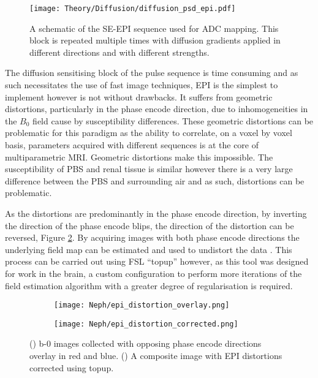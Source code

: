 \begin{figure}[H]
	\centering
	\texttt{[image: Theory/Diffusion/diffusion\_psd\_epi.pdf]}
	\caption{A schematic of the \ac{SE}-\ac{EPI} sequence used for \ac{ADC} mapping. This block is repeated multiple times with diffusion gradients applied in different directions and with different strengths.}
	\label{fig:ex_adc_psd}	
\end{figure}

The diffusion sensitising block of the pulse sequence is time consuming and as such necessitates the use of fast image techniques, \ac{EPI} is the simplest to implement however is not without drawbacks. It suffers from geometric distortions, particularly in the phase encode direction, due to inhomogeneities in the $B_0$ field cause by susceptibility differences. These geometric distortions can be problematic for this paradigm as the ability to correlate, on a voxel by voxel basis, parameters acquired with different sequences is at the core of multiparametric \ac{MRI}. Geometric distortions make this impossible. The susceptibility of \ac{PBS} and renal tissue is similar however there is a very large difference between the \ac{PBS} and surrounding air and as such, distortions can be problematic. 

As the distortions are predominantly in the phase encode direction, by inverting the direction of the phase encode blips, the direction of the distortion can be reversed, Figure \ref{fig:ex_epi_distortion_overlay}. By acquiring images with both phase encode directions the underlying field map can be estimated and used to undistort the data \cite{andersson_how_2003}. This process can be carried out using \ac{FSL} ``topup'' however, as this tool was designed for work in the brain, a custom configuration to perform more iterations of the field estimation algorithm with a greater degree of regularisation is required.

\begin{figure}[H]
	\centering
	\begin{subfigure}[c]{0.47\textwidth}
		\centering
		\texttt{[image: Neph/epi\_distortion\_overlay.png]}
		\caption{}
		\label{fig:ex_epi_distortion_overlay}
	\end{subfigure}
	\hfill
	\begin{subfigure}[c]{0.47\textwidth}
		\centering
		\texttt{[image: Neph/epi\_distortion\_corrected.png]}
		\caption{}
		\label{fig:ex_epi_distortion_corrected}
	\end{subfigure}
	\caption{() b-0 images collected with opposing phase encode directions overlay in red and blue. () A composite image with \ac{EPI} distortions corrected using topup.}
	\label{fig:ex_epi_distortion}
\end{figure}

